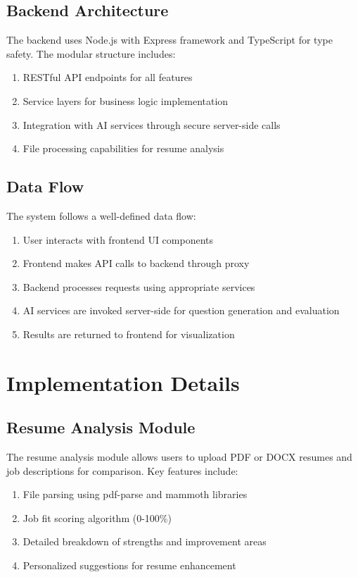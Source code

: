 \documentclass[12pt, conference]{IEEEtran}
\begin{document}
\subsection{Backend Architecture}

The backend uses Node.js with Express framework and TypeScript for type safety. The modular structure includes:
\begin{enumerate}
    \item RESTful API endpoints for all features
    \item Service layers for business logic implementation
    \item Integration with AI services through secure server-side calls
    \item File processing capabilities for resume analysis
\end{enumerate}

\subsection{Data Flow}

The system follows a well-defined data flow:
\begin{enumerate}
    \item User interacts with frontend UI components
    \item Frontend makes API calls to backend through proxy
    \item Backend processes requests using appropriate services
    \item AI services are invoked server-side for question generation and evaluation
    \item Results are returned to frontend for visualization
\end{enumerate}

\section{Implementation Details}

\subsection{Resume Analysis Module}

The resume analysis module allows users to upload PDF or DOCX resumes and job descriptions for comparison. Key features include:
\begin{enumerate}
    \item File parsing using pdf-parse and mammoth libraries
    \item Job fit scoring algorithm (0-100\%)
    \item Detailed breakdown of strengths and improvement areas
    \item Personalized suggestions for resume enhancement
\end{enumerate}
\end{document}

